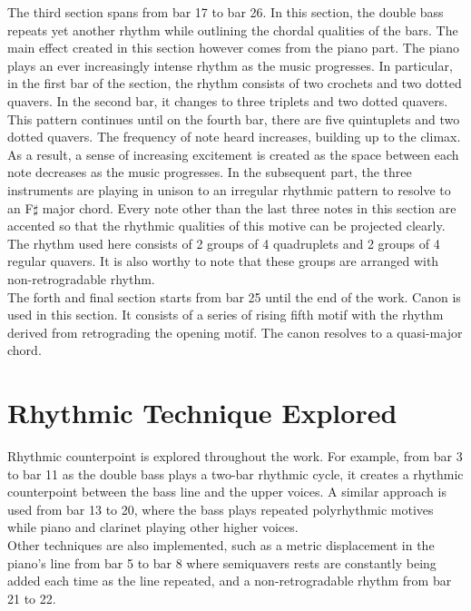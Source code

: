 \documentclass[a4paper]{article}
\begin{document}
The third section spans from bar 17 to bar 26. In this section, the double bass repeats yet another rhythm while outlining the chordal qualities of the bars. The main effect created in this section however comes from the piano part. The piano plays an ever increasingly intense rhythm as the music progresses. In particular, in the first bar of the section, the rhythm consists of two crochets and two dotted quavers. In the second bar, it changes to three triplets and two dotted quavers. This pattern continues until on the fourth bar, there are five quintuplets and two dotted quavers. The frequency of note heard increases, building up to the climax. As a result, a sense of increasing excitement is created as the space between each note decreases as the music progresses. In the subsequent part, the three instruments are playing in unison to an irregular rhythmic pattern to resolve to an F\(\sharp\) major chord. Every note other than the last three notes in this section are accented so that the rhythmic qualities of this motive can be projected clearly. The rhythm used here consists of 2 groups of 4 quadruplets and 2 groups of 4 regular quavers. It is also worthy to note that these groups are arranged with non-retrogradable rhythm.\\

The forth and final section starts from bar 25 until the end of the work. Canon is used in this section. It consists of a series of rising fifth motif with the rhythm derived from retrograding the opening motif. The canon resolves to a quasi-major chord.

\section{Rhythmic Technique Explored}
Rhythmic counterpoint is explored throughout the work. For example, from bar 3 to bar 11 as the double bass plays a two-bar rhythmic cycle, it creates a rhythmic counterpoint between the bass line and the upper voices. A similar approach is used from bar 13 to 20, where the bass plays repeated polyrhythmic motives while piano and clarinet playing other higher voices.\\

Other techniques are also implemented, such as a metric displacement in the piano's line from bar 5 to bar 8 where semiquavers rests are constantly being added each time as the line repeated, and a non-retrogradable rhythm from bar 21 to 22.
\end{document}
